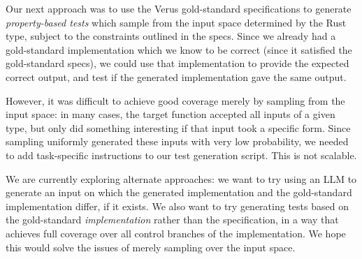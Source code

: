 Our next approach was to use the Verus gold-standard specifications to generate \emph{property-based tests}
which sample from the input space determined by the Rust type, 
subject to the constraints outlined in the specs.
Since we already had a gold-standard implementation which we know to be correct 
(since it satisfied the gold-standard specs), 
we could use that implementation to provide the expected correct output,
and test if the generated implementation gave the same output. 

However, it was difficult to achieve good coverage merely by sampling from the input space:
in many cases, the target function accepted all inputs of a given type,
but only did something interesting if that input took a specific form. 
Since sampling uniformly generated these inputs with very low probability,
we needed to add task-specific instructions to our test generation script.
This is not scalable.

We are currently exploring alternate approaches:
we want to try using an LLM to generate an input on which the generated implementation
and the gold-standard implementation differ, if it exists.
We also want to try generating tests based on the gold-standard \emph{implementation} rather than the specification,
in a way that achieves full coverage over all control branches of the implementation.
We hope this would solve the issues of merely sampling over the input space.